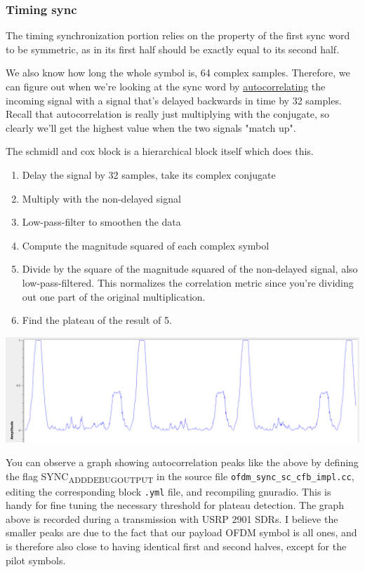 \documentclass[11pt]{article}
\begin{document}
\subsubsection{Timing sync}
\label{sec:org76ea7a8}
The timing synchronization portion relies on the property of the first
sync word to be symmetric, as in its first half should be exactly
equal to its second half.

We also know how long the whole symbol is, 64 complex
samples. Therefore, we can figure out when we're looking at the sync
word by \href{https://notes.esrh.me/autocorrelation.html}{autocorrelating} the incoming signal with a signal that's
delayed backwards in time by 32 samples. Recall that autocorrelation
is really just multiplying with the conjugate, so clearly we'll get
the highest value when the two signals "match up".

The schmidl and cox block is a hierarchical block itself which does
this.
\begin{enumerate}
\item Delay the signal by 32 samples, take its complex conjugate
\item Multiply with the non-delayed signal
\item Low-pass-filter to smoothen the data
\item Compute the magnitude squared of each complex symbol
\item Divide by the square of the magnitude squared of the non-delayed
signal, also low-pass-filtered. This normalizes the correlation
metric since you're dividing out one part of the original multiplication.
\item Find the plateau of the result of 5.
\end{enumerate}

\begin{center}
\includegraphics[width=\textwidth]{./images/sc.png}
\end{center}

You can observe a graph showing autocorrelation peaks like the above
by defining the flag SYNC\textsubscript{ADD}\textsubscript{DEBUG}\textsubscript{OUTPUT} in the source file
\texttt{ofdm\_sync\_sc\_cfb\_impl.cc}, editing the corresponding block \texttt{.yml}
file, and recompiling gnuradio. This is handy for fine tuning the
necessary threshold for plateau detection. The graph above is recorded
during a transmission with USRP 2901 SDRs. I believe the smaller peaks
are due to the fact that our payload OFDM symbol is all ones, and is
therefore also close to having identical first and second halves,
except for the pilot symbols.
\end{document}

